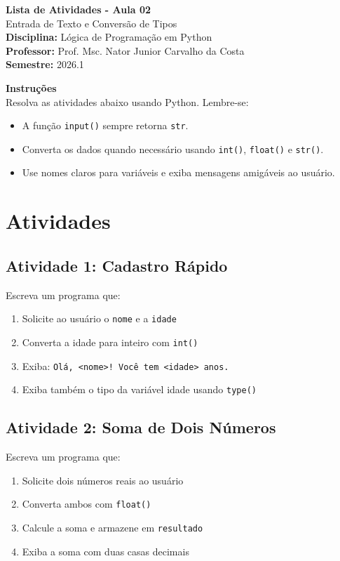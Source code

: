 \documentclass[12pt]{article}
\begin{document}
\begin{center}
{\LARGE \textbf{Lista de Atividades - Aula 02}}\\[4pt]
{\large Entrada de Texto e Conversão de Tipos}\\[10pt]
\textbf{Disciplina:} Lógica de Programação em Python\\
\textbf{Professor:} Prof. Msc. Nator Junior Carvalho da Costa\\
\textbf{Semestre:} 2026.1
\end{center}

\vspace{8pt}
\colorbox{lightbg}{%
\parbox{\dimexpr\linewidth-2\fboxsep\relax}{%
\textbf{Instruções}\\
Resolva as atividades abaixo usando Python. Lembre-se:
\begin{itemize}
    \item A função \texttt{input()} sempre retorna \texttt{str}.
    \item Converta os dados quando necessário usando \texttt{int()}, \texttt{float()} e \texttt{str()}.
    \item Use nomes claros para variáveis e exiba mensagens amigáveis ao usuário.
\end{itemize}
}}

\section*{Atividades}

\subsection*{Atividade 1: Cadastro Rápido}
Escreva um programa que:
\begin{enumerate}
    \item Solicite ao usuário o \texttt{nome} e a \texttt{idade}
    \item Converta a idade para inteiro com \texttt{int()}
    \item Exiba: \texttt{Olá, <nome>! Você tem <idade> anos.}
    \item Exiba também o tipo da variável idade usando \texttt{type()}
\end{enumerate}

\subsection*{Atividade 2: Soma de Dois Números}
Escreva um programa que:
\begin{enumerate}
    \item Solicite dois números reais ao usuário
    \item Converta ambos com \texttt{float()}
    \item Calcule a soma e armazene em \texttt{resultado}
    \item Exiba a soma com duas casas decimais
\end{enumerate}
\end{document}
